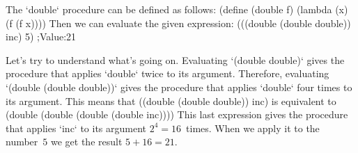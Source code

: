 The `double` procedure can be defined as follows:
\begtt\scm 
(define (double f)
  (lambda (x) (f (f x))))
\endtt
Then we can evaluate the given expression:
\begtt\scm
(((double (double double)) inc) 5)
;Value:21
\endtt

Let's try to understand what's going on. Evaluating `(double double)` gives the procedure that applies `double` twice to its argument.  Therefore, evaluating `(double (double double))` gives the procedure that applies `double` four times to its argument.  This means that
\begtt\scm
((double (double double)) inc)
\endtt
is equivalent to
\begtt\scm
(double (double (double (double inc))))
\endtt
This last expression gives the procedure that applies `inc` to its argument $2^4=16$~times. When we apply it to the number~$5$ we get the result $5+16=21$.
